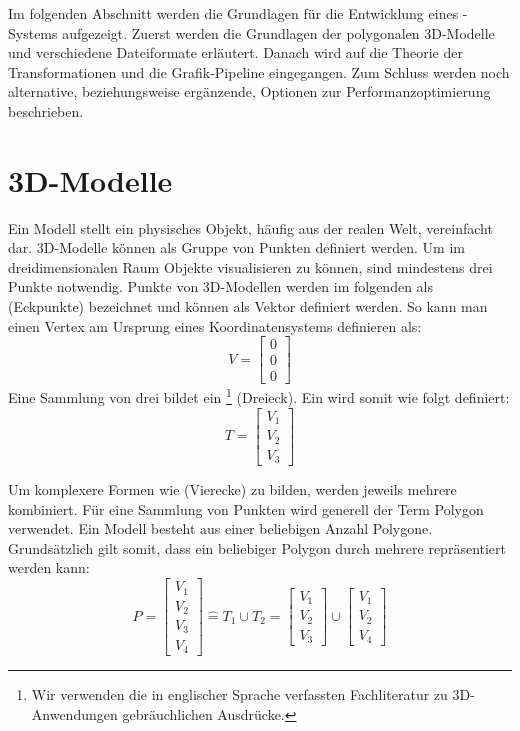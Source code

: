 
Im folgenden Abschnitt werden die Grundlagen für die Entwicklung eines -Systems aufgezeigt.
Zuerst werden die Grundlagen der polygonalen 3D-Modelle und verschiedene Dateiformate erläutert. Danach wird auf die Theorie der Transformationen und die Grafik-Pipeline eingegangen. Zum Schluss werden noch alternative, beziehungsweise ergänzende, Optionen zur Performanzoptimierung beschrieben.

\section{3D-Modelle}
Ein Modell stellt ein physisches Objekt, häufig aus der realen Welt, vereinfacht dar.
3D-Modelle können als Gruppe von Punkten definiert werden.
Um im dreidimensionalen Raum Objekte visualisieren zu können, sind mindestens drei Punkte notwendig.
Punkte von 3D-Modellen werden im folgenden als  (Eckpunkte) bezeichnet und können als Vektor definiert werden.
So kann man einen Vertex am Ursprung eines Koordinatensystems definieren als:
$$ V =
\begin{bmatrix}
  0 \\
  0 \\
  0
\end{bmatrix}
$$
Eine Sammlung von drei  bildet ein \footnote{Wir verwenden die in englischer Sprache verfassten Fachliteratur zu 3D-Anwendungen gebräuchlichen Ausdrücke.} (Dreieck). Ein  wird somit wie folgt definiert:
$$ T =
\begin{bmatrix}
  V_1 \\
  V_2 \\
  V_3
\end{bmatrix}
$$

Um komplexere Formen wie  (Vierecke) zu bilden, werden jeweils mehrere  kombiniert. Für eine Sammlung von Punkten wird generell der Term Polygon verwendet.
Ein Modell besteht aus einer beliebigen Anzahl Polygone.
Grundsätzlich gilt somit, dass ein beliebiger Polygon durch mehrere  repräsentiert werden kann:
$$ P =
\begin{bmatrix}
  V_1 \\
  V_2 \\
  V_3 \\
  V_4
\end{bmatrix}
\widehat{=} T_1 \cup T_2
= \begin{bmatrix}
  V_1 \\
  V_2 \\
  V_3
\end{bmatrix}
\cup
\begin{bmatrix}
  V_1 \\
  V_2 \\
  V_4
\end{bmatrix}
$$

